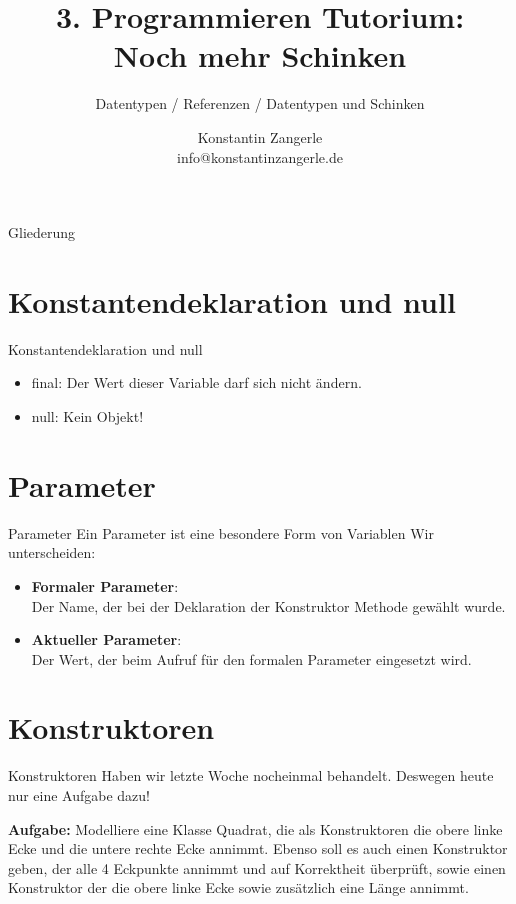 \documentclass[18pt]{beamer}
\title[Programmieren Tutorium]{3. Programmieren Tutorium:\\ Noch mehr Schinken}
\subtitle{Datentypen / Referenzen / Datentypen und Schinken}
\author{Konstantin Zangerle \\ info@konstantinzangerle.de}
\begin{document}

\begin{frame}
\titlepage
\end{frame}

\begin{frame}{Gliederung}
\tableofcontents
\end{frame}




\section{Konstantendeklaration und null}
\begin{frame}{Konstantendeklaration und null}
\begin{itemize}
 \item final: Der Wert dieser Variable darf sich nicht ändern.
 \item null: Kein Objekt!
\end{itemize}
\end{frame}



\section{Parameter}
\begin{frame}{Parameter}
Ein Parameter ist eine besondere Form von Variablen
Wir unterscheiden:
\begin{itemize}
 \item \textbf{Formaler Parameter}: \pause \\
  Der Name, der bei der Deklaration der Konstruktor Methode gewählt wurde.
  
 \item \textbf{Aktueller Parameter}:\pause \\
 Der Wert, der beim Aufruf für den formalen Parameter eingesetzt wird.
\end{itemize}
\end{frame}


\section{Konstruktoren}
\begin{frame}{Konstruktoren}
 Haben wir letzte Woche nocheinmal behandelt.
 Deswegen heute nur eine Aufgabe dazu!
 
 \textbf{Aufgabe:} Modelliere eine Klasse Quadrat, die als Konstruktoren die obere linke Ecke und die untere rechte Ecke annimmt.
 Ebenso soll es auch einen Konstruktor geben, der alle 4 Eckpunkte annimmt und auf Korrektheit überprüft, sowie einen Konstruktor
 der die obere linke Ecke sowie zusätzlich eine Länge annimmt.
\end{frame}
\end{document}
